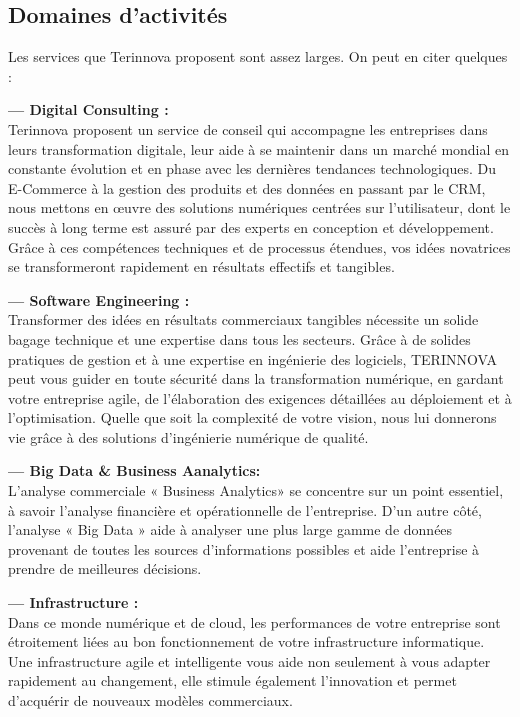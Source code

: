 \documentclass[a4paper, 12pt]{report}
\begin{document}
\subsection{Domaines d'activités}
{ Les services que Terinnova proposent sont assez larges. On peut en citer quelques : 


\textbf{--- Digital Consulting : }
\\
Terinnova proposent un service de conseil qui accompagne les entreprises dans leurs transformation digitale, leur aide à se maintenir dans un marché mondial en constante évolution et en phase avec les dernières tendances technologiques. Du E-Commerce à la gestion des produits et des données en passant par le CRM, nous mettons en œuvre des solutions numériques centrées sur l'utilisateur, dont le succès à long terme est assuré par des experts en conception et développement. Grâce à ces compétences techniques et de processus étendues, vos idées novatrices se transformeront rapidement en résultats effectifs et tangibles.

\textbf{--- Software Engineering :} 
\\
Transformer des idées en résultats commerciaux tangibles nécessite un solide bagage technique et une expertise dans tous les secteurs. Grâce à de solides pratiques de gestion et à une expertise en ingénierie des logiciels, TERINNOVA peut vous guider en toute sécurité dans la transformation numérique, en gardant votre entreprise agile, de l'élaboration des exigences détaillées au déploiement et à l'optimisation. Quelle que soit la complexité de votre vision, nous lui donnerons vie grâce à des solutions d'ingénierie numérique de qualité. 

\textbf{--- Big Data \& Business Aanalytics:}  
\\
L’analyse commerciale « Business Analytics» se concentre sur un point essentiel, à savoir l'analyse financière et opérationnelle de l'entreprise. D'un autre côté, l'analyse « Big Data » aide à analyser une plus large gamme de données provenant de toutes les sources d'informations possibles et aide l'entreprise à prendre de meilleures décisions. 

\textbf{--- Infrastructure :}
\\
Dans ce monde numérique et de cloud, les performances de votre entreprise sont étroitement liées au bon fonctionnement de votre infrastructure informatique. Une infrastructure agile et intelligente vous aide non seulement à vous adapter rapidement au changement, elle stimule également l'innovation et permet d'acquérir de nouveaux modèles commerciaux. 
}
\end{document}
